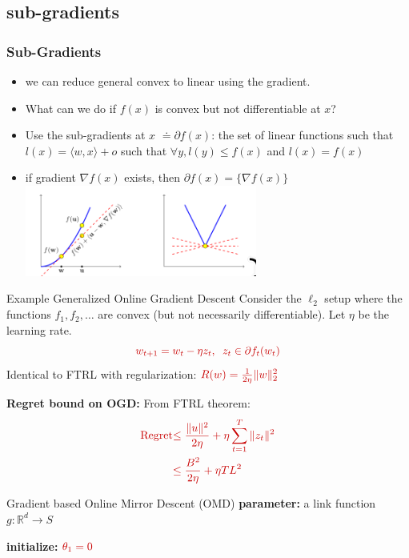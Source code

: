 \documentclass{beamer}
\newcommand{\mathred}[1]{\textcolor{mathred}{#1}}
\begin{document}
\begin{small}
\subsection{sub-gradients}
\begin{frame}
  \frametitle{Sub-Gradients}
  \begin{itemize}
  \item we can reduce general convex to linear using the gradient.
  \item   What can we do if $f(x)$ is convex but not differentiable at $x$?
  \item Use the sub-gradients at $x$ $\doteq\partial f(x)$: the set of linear functions such that
    $l(x)=\langle w,x \rangle + o$ such that
    $\forall y, l(y) \leq f(x)$ and $l(x) = f(x)$
  \item if gradient $\nabla f(x)$ exists, then $\partial f(x) = \{\nabla f(x)\}$
    \includegraphics[width=0.6\textwidth]{figures/SubGradient.png}
  \end{itemize}
  
\end{frame}


\begin{frame}{Example Generalized Online Gradient Descent}
  Consider the $\ell_2$ setup where the functions $f_1,f_2,\ldots$ are convex (but not necessarily differentiable).
  Let $\eta$ be the learning rate.
\[
  \mathred{w_{t+1} = w_t - \eta z_t,\;\;
    z_t \in \partial f_t(w_t)}
\]
Identical to FTRL with regularization: $\mathred{R(w) = \frac{1}{2\eta}\|w\|_2^2}$

{\bf Regret bound on OGD:} From FTRL theorem:
\begin{align*}
\mathred{\text{Regret}} &\mathred{\leq \frac{\|u\|^2}{2\eta} + \eta \sum_{t=1}^T \|z_t\|^2} \\
&\mathred{\leq \frac{B^2}{2\eta} + \eta T L^2}
\end{align*}
\end{frame}


\begin{frame}{Gradient based Online Mirror Descent (OMD)}
\textbf{parameter:} a link function \( g : \mathbb{R}^d \to S \)

\textbf{initialize:} \( \textcolor{mathcolor}{\theta_1 = 0} \)


\end{frame}
\end{small}
\end{document}

